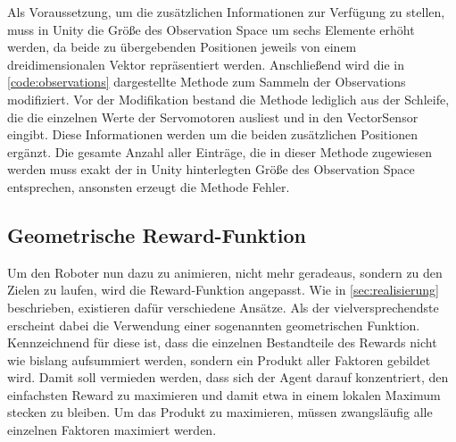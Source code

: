Als Voraussetzung, um die zusätzlichen Informationen zur Verfügung zu stellen, muss in Unity die Größe des Observation Space um sechs Elemente erhöht werden, da beide zu übergebenden Positionen jeweils von einem dreidimensionalen Vektor repräsentiert werden.
Anschließend wird die in \autoref{code:observations} dargestellte Methode zum Sammeln der Observations modifiziert.
Vor der Modifikation bestand die Methode lediglich aus der Schleife, die die einzelnen Werte der Servomotoren ausliest und in den VectorSensor eingibt.
Diese Informationen werden um die beiden zusätzlichen Positionen ergänzt.
Die gesamte Anzahl aller Einträge, die in dieser Methode zugewiesen werden muss exakt der in Unity hinterlegten Größe des Observation Space entsprechen, ansonsten erzeugt die Methode Fehler.

\begin{figure}
    
\end{figure}

\subsection{Geometrische Reward-Funktion}
Um den Roboter nun dazu zu animieren, nicht mehr geradeaus, sondern zu den Zielen zu laufen, wird die Reward-Funktion angepasst.
Wie in \autoref{sec:realisierung} beschrieben, existieren dafür verschiedene Ansätze.
Als der vielversprechendste erscheint dabei die Verwendung einer sogenannten geometrischen Funktion.
Kennzeichnend für diese ist, dass die einzelnen Bestandteile des Rewards nicht wie bislang aufsummiert werden, sondern ein Produkt aller Faktoren gebildet wird.
Damit soll vermieden werden, dass sich der Agent darauf konzentriert, den einfachsten Reward zu maximieren und damit etwa in einem lokalen Maximum stecken zu bleiben.
Um das Produkt zu maximieren, müssen zwangsläufig alle einzelnen Faktoren maximiert werden.

